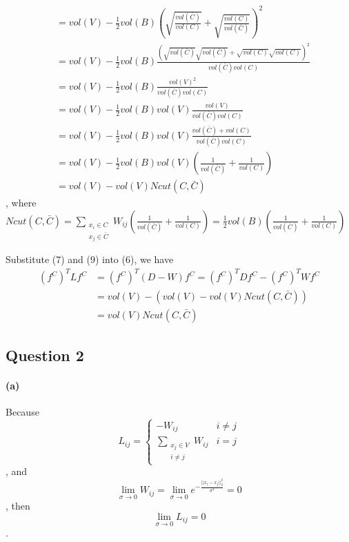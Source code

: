 \documentclass{article}
\begin{document}
\begin{equation}
\begin{split}
  & = vol(V) -  \frac{1}{2} vol(B)(\sqrt{\frac{vol(\bar{C})}{vol(C)}} + \sqrt{\frac{vol(C)}{vol(\bar{C})}})^2\\
  & = vol(V) -  \frac{1}{2}vol(B)\frac{(\sqrt{vol(\bar{C})}\sqrt{vol(\bar{C})}+\sqrt{vol(C)} \sqrt{vol(C)})^2}{vol(\bar{C})vol(C)}\\
  & = vol(V) -  \frac{1}{2}vol(B)\frac{vol(V)^2}{vol(\bar{C})vol(C)}\\
  & = vol(V) -  \frac{1}{2}vol(B)vol(V)\frac{vol(V)}{vol(\bar{C})vol(C)}\\
  & = vol(V) -  \frac{1}{2}vol(B)vol(V)\frac{vol(\bar{C})+vol(C)}{vol(\bar{C})vol(C)}\\
  & = vol(V) -  \frac{1}{2}vol(B)vol(V)(\frac{1}{vol(\bar{C})}+\frac{1}{vol(C)})\\
  & = vol(V) - vol(V) Ncut(C,\bar{C})
\end{split}
\end{equation}
, where $Ncut(C,\bar{C}) = \sum_{\substack{x_i \in C \\ x_j \in \bar{C}}} W_{ij} (\frac{1}{vol(\bar{C})}+\frac{1}{vol(C)}) = \frac{1}{2}vol(B)(\frac{1}{vol(\bar{C})}+\frac{1}{vol(C)})$

Substitute (7) and (9) into (6), we have
\begin{equation}
  \begin{split}
  (f^C)^T Lf^{C} & = (f^C)^T (D-W) f^{C} = (f^C)^T Df^{C} - (f^C)^T Wf^{C}\\
  & = vol(V) - (vol(V) - vol(V) Ncut(C,\bar{C}))\\
  & = vol(V) Ncut(C,\bar{C})
\end{split}
\end{equation}

\subsection*{Question 2}
\paragraph{(a)}

Because  $$ L_{ij} = \begin{cases} -W_{ij} & i \neq j\\ \sum_{\substack{x_j \in V \\ i \neq j}} W_{ij} & i = j \end{cases}$$,
and $$\lim_{\sigma \rightarrow 0} W_{ij} = \lim_{\sigma \rightarrow 0} e^{-\frac{||x_{i}-x_{j}||_{2}^{2}}{\sigma^{2}}} = 0 $$,
then $$ \lim_{\sigma \rightarrow 0} L_{ij} = 0 $$.
\end{document}
